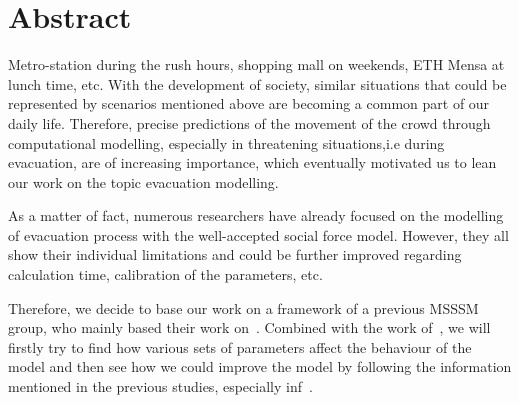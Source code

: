 \section{Abstract}
Metro-station during the rush hours, shopping mall on weekends, ETH Mensa at lunch time, etc. With the development of society, similar situations that could be represented by scenarios mentioned  above are becoming a common part of our daily life. Therefore, precise predictions of the movement of the crowd through computational modelling, especially in threatening situations,i.e during evacuation, are of increasing importance, which eventually motivated us to lean our work on the topic evacuation modelling.

As a matter of fact, numerous researchers have already focused on the modelling of evacuation process with the well-accepted social force model. However, they all show their individual limitations and could be further improved regarding calculation time, calibration of the parameters, etc.

Therefore, we decide to base our work on a framework of a previous MSSSM group, who mainly based their work on~\citet{Helbing2000}. Combined with the work of~\citet{Wang2016}, we will firstly try to find how various sets of parameters affect the behaviour of the model and then see how we could improve the model by following the information mentioned in the previous studies, especially inf~\citet{Wang2016}.
